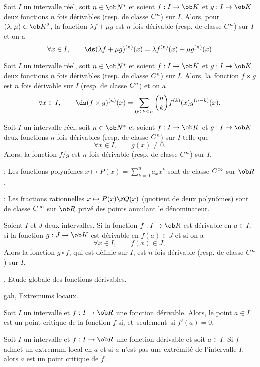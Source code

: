 \Theoreme []  Soit $I$ un intervalle réel, soit $n\in\ob N^*$ et soient $f:I\to\ob K$ et $g:I\to\ob K$ 
\pn
deux fonctions $n$ fois dérivables (resp. de classe $\sc C^n$) sur $I$. 
Alors, pour $(\lambda,\mu)\in\ob K^2$, la fonction $\lambda f+\mu g$ est $n$ fois dérivable 
(resp. de classe $\sc C^n$) sur $I$ et on a 
$$
\forall x\in I, \qquad {\ds(\lambda f+\mu g)^{(n)}(x)=\lambda f^{(n)}(x)+\mu g^{(n)}(x)}
$$

\Theoreme [Title=Formule de Leibniz] Soit $I$ un intervalle réel, soit $n\in\ob N^*$ et soient $f:I\to\ob K$ et $g:I\to\ob K$ 
deux fonctions $n$ fois dérivables (resp. de classe $\sc C^n$) sur $I$. Alors, la~fonction $f\times g$ 
est $n$ fois dérivable sur $I$ (resp. de classe $\sc C^n$) et on a 
$$
\forall x\in I, \qquad {\ds(f\times g)^{(n)}(x)=\sum_{0\le k\le n}{n\choose k}f^{(k)}(x)g^{(n-k)}(x)}.
$$


\Propriete []  Soit $I$ un intervalle réel, soit $n\in\ob N^*$ et soient $f:I\to\ob K$ et $g:I\to\ob K$ 
\pn
deux fonctions $n$ fois dérivables (resp. de classe $\sc C^n$) sur $I$ telle que 
$$
\forall x\in I, \qquad g(x)\neq 0.
$$ 
Alors, la fonction $f/g$ est $n$ fois dérivable (resp. de classe $\sc C^n$) sur $I$. 

\Remarque : Les fonctions polynômes $x\mapsto P(x)=\sum_{k=0}^n a_xx^k$ sont de classe $\sc C^\infty$ 
sur $\ob R$. 
\bigskip

\Remarque  : Les fractions rationnelles $x\mapsto {P(x)\F Q(x)}$ (quotient de deux polynômes) sont de classe $\sc C^\infty$ sur $\ob R$ privé des points annulant le dénominateur. 
\bigskip

 
\Theoreme []  Soient $I$ et $J$ deux intervalles. Si la fonction $f:I\to\ob R$ 
est dérivable en $a\in I$, si la fonction $g:J\to\ob K$ est dérivable en $f(a)\in J$ et si on a 
$$
\forall x\in I, \qquad f(x)\in J,
$$
Alors la fonction $g\circ f$, qui est définie sur $I$, est $n$ fois dérivable (resp. de classe $\sc C^n$) sur $I$. 

\Section , Etude globale des fonctions dérivables. 


\Subsection gah, Extremums locaux. 

\Definition []  Soit $I$ un intervalle et $f:I\to\ob R$ une fonction dérivable. Alors, le point $a\in I$ est un point critique de la fonction $f$ si, et~seulement~si $f'(a)=0$. 
\bigskip

\Propriete []  Soit $I$ un intervalle et $f:I\to\ob R$ une fonction dérivable et soit $a\in I$. Si $f$ admet un extremum local en $a$ et si $a$ n'est pas une extrémité de l'intervalle $I$, alors $a$ est un point critique de $f$. 
\bigskip

